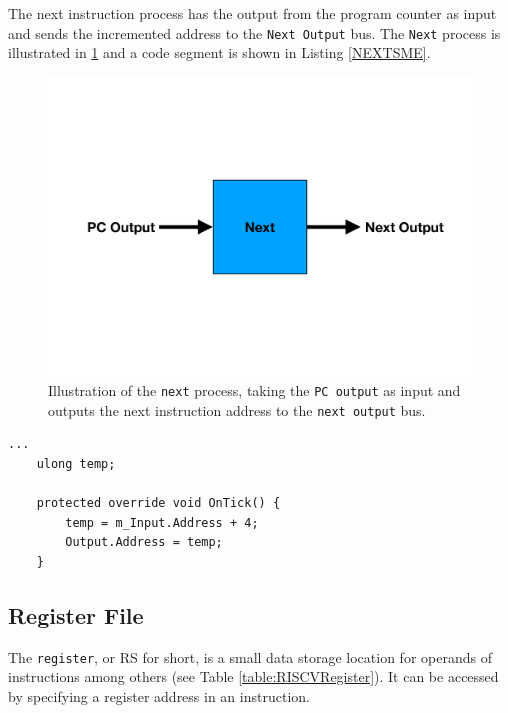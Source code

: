         The next instruction process has the output from the program counter as input and sends the incremented address to the \texttt{Next Output} bus. The \texttt{Next} process is illustrated in \ref{fig:NEXT} and a code segment is shown in Listing \ref{NEXTSME}.
        
        \begin{figure}[h!]
            \centering
            \includegraphics[scale=0.34]{pictures/Next.pdf}
            \caption{Illustration of the \texttt{next} process, taking the \texttt{PC output} as input and outputs the next instruction address to the \texttt{next output} bus.}
            \label{fig:NEXT}
        \end{figure}
    
        \begin{minipage}{\linewidth}
            \begin{lstlisting}[language={[Sharp]C}, caption={A slice of the \texttt{Next} process SME code. Here we declare a temporary varible, which contains the program counter output. We increment the temporary variable by four and place it in the output bus.},captionpos=b, label = NEXTSME]
...
    ulong temp;
    
    protected override void OnTick() {
        temp = m_Input.Address + 4;
        Output.Address = temp;
    }
            \end{lstlisting}
        \end{minipage}  
        
    
    \subsection{Register File}
        The \texttt{register}, or RS for short, is a small data storage location for operands of instructions among others (see Table \ref{table:RISCVRegister}). It can be accessed by specifying a register address in an instruction. 
        
